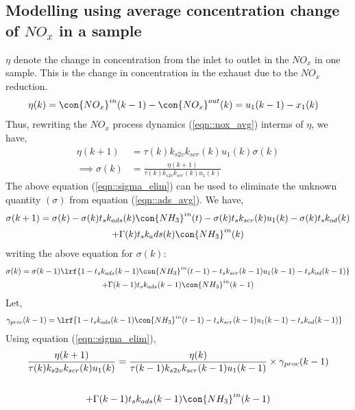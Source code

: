 \subsection{Modelling using average concentration change of $NO_x$ in a sample}
$\eta$ denote the change in concentration from the inlet to outlet in the $NO_x$ in one sample. This is the change in concentration in the exhaust due to the $NO_x$ reduction.
%
\begin{align}
        \eta(k) &= \con{NO_x}^{in}(k-1) - \con{NO_x}^{out}(k) = u_1(k-1) - x_1(k)
\end{align}
%
Thus, rewriting the $NO_x$ process dynamics (\ref{eqn::nox_avg}) interms of $\eta$, we have,
\begin{align}
        \eta(k+1) &= \tau(k) k_{s2v} k_{scr}(k) u_1(k) \sigma(k)\\
        \implies \sigma(k) &= \frac{\eta(k+1)}{\tau(k) k_{s2v} k_{scr}(k) u_1(k)}
        \label{eqn::sigma_elim}
\end{align}
%
The above equation (\ref{eqn::sigma_elim}) can be used to eliminate the unknown quantity $(\sigma)$ from equation (\ref{eqn::ads_avg}). We have,
\begin{multline}
        \sigma(k+1) = \sigma(k) - \sigma(k) t_s k_{ads}(k) \con{NH_3}^{in}(t)
                        - \sigma(k) t_s k_{scr}(k) u_1(k)
                        - \sigma(k) t_s k_{od}(k)
                        \\ + \Gamma(k) t_s k_ads(k) \con{NH_3}^{in}(k)
\end{multline}
writing the above equation for $\sigma(k)$:
\begin{multline*}
         \sigma(k) = \sigma(k-1)\lrf{1 -  t_s k_{ads}(k-1) \con{NH_3}^{in}(t-1)
                        -  t_s k_{scr}(k-1) u_1(k-1)
                        -  t_s k_{od}(k-1)}
                        \\ + \Gamma(k-1) t_s k_{ads}(k-1) \con{NH_3}^{in}(k-1)
\end{multline*}
Let,
\begin{align}
        \gamma_{proc}(k-1) &= \lrf{1 -  t_s k_{ads}(k-1) \con{NH_3}^{in}(t-1)
                        -  t_s k_{scr}(k-1) u_1(k-1)
                        -  t_s k_{od}(k-1)}
\end{align}
Using equation (\ref{eqn::sigma_elim}),
\begin{multline*}
        \frac{\eta(k+1)}{\tau(k) k_{s2v} k_{scr}(k) u_1(k)}
        = \frac{\eta(k)}{\tau(k-1) k_{s2v} k_{scr}(k-1) u_1(k-1)} \times \gamma_{proc}(k-1)\\
                        \\ + \Gamma(k-1) t_s k_{ads}(k-1) \con{NH_3}^{in}(k-1)
\end{multline*}
